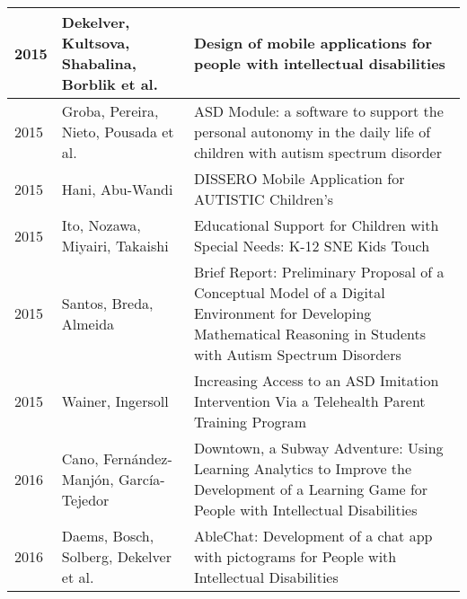 \documentclass[utf8,english]{gradu3}
\begin{document}
\begin{longtable}{|>{\scriptsize}l|>{\scriptsize}p{3cm}|>{\scriptsize}p{10.4cm}|}
  2015          & Dekelver, Kultsova, Shabalina, Borblik et al.                & Design of mobile applications for people with intellectual disabilities                                                                                                                                                        \\ \hline
  2015          & Groba, Pereira, Nieto, Pousada et al.                        & ASD Module: a software to support the personal autonomy in the daily life of children with autism spectrum disorder                                                                                                            \\ \hline
  2015          & Hani, Abu-Wandi                                              & DISSERO Mobile Application for AUTISTIC Children's                                                                                                                                                                             \\ \hline
  2015          & Ito, Nozawa, Miyairi, Takaishi                               & Educational Support for Children with Special Needs: K-12 SNE Kids Touch                                                                                                                                                       \\ \hline
  2015          & Santos, Breda, Almeida                                       & Brief Report: Preliminary Proposal of a Conceptual Model of a Digital Environment for Developing Mathematical Reasoning in Students with Autism Spectrum Disorders                                                             \\ \hline
  2015          & Wainer, Ingersoll                                            & Increasing Access to an ASD Imitation Intervention Via a Telehealth Parent Training Program                                                                                                                                    \\ \hline
  2016          & Cano, Fernández-Manjón, García-Tejedor                       & Downtown, a Subway Adventure: Using Learning Analytics to Improve the Development of a Learning Game for People with Intellectual Disabilities                                                                                 \\ \hline
  2016          & Daems, Bosch, Solberg, Dekelver et al.                       & AbleChat: Development of a chat app with pictograms for People with Intellectual Disabilities                                                                                                                                  \\ \hline

\end{longtable}
\end{document}
